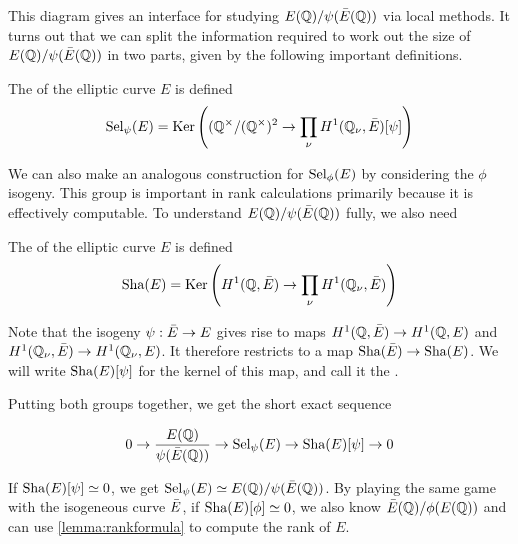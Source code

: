 \documentclass[12pt, a4paper]{report}
\begin{document}

This diagram gives an interface for studying $E({\mathbb Q})/\psi(\bar{E}({\mathbb Q}))$ via
local methods. It turns out that we can split the information required to work
out the size of $E({\mathbb Q})/\psi(\bar{E}({\mathbb Q}))$ in two parts, given by the following
important definitions.

\begin{defn}
  The  of the elliptic curve $E$ is defined
  $$\text{\normalfont Sel}_\psi(E) = \text{Ker}\left(({\mathbb Q}^{\times}/({\mathbb Q}^{\times})^2 \rightarrow
  \prod\limits_\nu H^1({\mathbb Q}_\nu, \bar{E})[\psi]\right)$$
\end{defn}

We can also make an analogous construction for $\text{\normalfont Sel}_\phi(E)$ by
considering the $\phi$ isogeny. 
This group is important in rank calculations primarily because it is effectively
computable. To understand $E({\mathbb Q})/\psi(\bar{E}({\mathbb Q}))$ fully, we also need

\newpage

\begin{defn} \label{defn:sha}
  The  of the elliptic curve $E$ is defined
  $$ \text{\normalfont Sha}(E) = \text{Ker} 
  \left(H^1({\mathbb Q}, \bar{E}) \rightarrow \prod\limits_\nu H^1 ({\mathbb Q}_\nu,
  \bar{E})\right) $$
\end{defn}
Note that the isogeny $\psi: \bar{E} \rightarrow E$ gives rise to maps $H^1({\mathbb Q},
\bar{E}) \rightarrow H^1({\mathbb Q},E)$ and $H^1({\mathbb Q}_\nu, \bar{E}) \rightarrow H^1({\mathbb Q}_\nu, E)$. It
therefore restricts to a map $\text{\normalfont Sha}(\bar{E}) \rightarrow \text{\normalfont Sha}(E)$. We will write
$\text{\normalfont Sha}(E)[\psi]$ for the kernel of this map, and call it the
.

Putting both groups together, we get the short exact sequence

\[ 0 \rightarrow \frac{E({\mathbb Q})}{\psi(\bar{E}({\mathbb Q}))} \rightarrow \text{\normalfont Sel}_\psi(E) \rightarrow \text{\normalfont Sha}(E)[\psi]
  \rightarrow 0\]

If $\text{\normalfont Sha}(E)[\psi] \simeq 0$, we get
$\text{\normalfont Sel}_\psi(E) \simeq E({\mathbb Q})/\psi(\bar{E}({\mathbb Q}))$. By playing
the same game with the isogeneous curve $\bar{E}$, if $\text{\normalfont Sha}(E)[\phi] \simeq 0$,
we also know $\bar{E}({\mathbb Q})/\phi(E({\mathbb Q}))$ and can use \ref{lemma:rankformula} to compute
the rank of $E$. 
\end{document}
